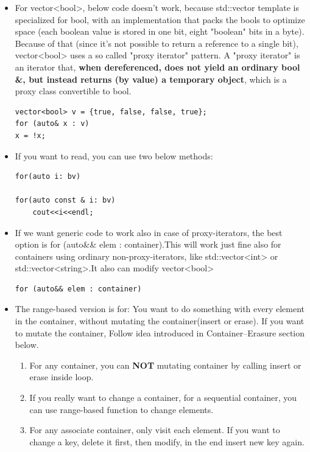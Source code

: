 \documentclass[a4paper,11pt,twoside]{book}
\begin{document}
\begin{itemize}
\begin{enumerate}
	\end{enumerate}
	
	
	\item For vector<bool>, below code doesn't work, because std::vector template is specialized for bool, with an implementation that packs the bools to optimize space (each boolean value is stored in one bit, eight "boolean" bits in a byte). Because of that (since it's not possible to return a reference to a single bit), vector<bool> uses a so called "proxy iterator" pattern. A "proxy iterator" is an iterator that, \textbf{when dereferenced, does not yield an ordinary bool \&, but instead returns (by value) a temporary object}, which is a proxy class convertible to bool. 
\begin{lstlisting}[numbers=none]
vector<bool> v = {true, false, false, true};
for (auto& x : v)
x = !x;
\end{lstlisting}

	
	\item If you want to read, you can use two below methods:
\begin{lstlisting}[numbers=none]
for(auto i: bv)

for(auto const & i: bv)
	cout<<i<<endl;
\end{lstlisting}
	
	\item If we want generic code to work also in case of proxy-iterators, the best option is for (auto\&\& elem : container).This will work just fine also for containers using ordinary non-proxy-iterators, like std::vector<int> or std::vector<string>.It also can modify vector<bool> 
\begin{lstlisting}[numbers=none]
for (auto&& elem : container)
\end{lstlisting}
	
	\item The range-based version is for: You want to do something with every element in the container, without mutating the container(insert or erase). If you want to mutate the container, Follow idea introduced in Container--Erasure section below.
	
	\begin{enumerate}
		\item For any container, you can \textbf{NOT} mutating container by calling insert or erase inside loop.
		\item If you really want to change a container, for a sequential container, you can use range-based function to change elements. 
		\item For any associate container, only visit each element. If you want to change a key, delete it first, then modify, in the end insert new key again. 
	\end{enumerate}
	
\end{itemize}
\end{document}
